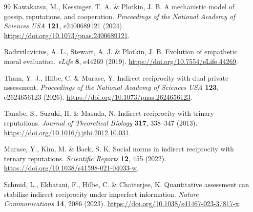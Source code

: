 \documentclass[fleqn,10pt]{wlscirep}
\begin{document}
\begin{thebibliography}{99}
Kawakatsu, M., Kessinger, T. A. \& Plotkin, J. B.
A mechanistic model of gossip, reputations, and cooperation.
\textit{Proceedings of the National Academy of Sciences USA} \textbf{121}, e2400689121 (2024).
\url{https://doi.org/10.1073/pnas.2400689121}.

Radzvilavicius, A. L., Stewart, A. J. \& Plotkin, J. B.
Evolution of empathetic moral evaluation.
\textit{eLife} \textbf{8}, e44269 (2019).
\url{https://doi.org/10.7554/eLife.44269}.

Tham, Y. J., Hilbe, C. \& Murase, Y.
Indirect reciprocity with dual private assessment.
\textit{Proceedings of the National Academy of Sciences USA} \textbf{123}, e2624656123 (2026).
\url{https://doi.org/10.1073/pnas.2624656123}.


Tanabe, S., Suzuki, H. \& Masuda, N.
Indirect reciprocity with trinary reputations.
\textit{Journal of Theoretical Biology} \textbf{317}, 338--347 (2013).
\url{https://doi.org/10.1016/j.jtbi.2012.10.031}.

Murase, Y., Kim, M. \& Baek, S. K.
Social norms in indirect reciprocity with ternary reputations.
\textit{Scientific Reports} \textbf{12}, 455 (2022).
\url{https://doi.org/10.1038/s41598-021-04033-w}.

Schmid, L., Ekbatani, F., Hilbe, C. \& Chatterjee, K.
Quantitative assessment can stabilize indirect reciprocity under imperfect information.
\textit{Nature Communications} \textbf{14}, 2086 (2023).
\url{https://doi.org/10.1038/s41467-023-37817-x}.




\end{thebibliography}



\clearpage
\begingroup
\setcounter{figure}{0}
\renewcommand{\figurename}{Extended Data Fig.}
\ifdefined\theHfigure
\renewcommand{\theHfigure}{ED\arabic{figure}}
\fi
\end{document}
